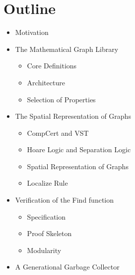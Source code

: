 \documentclass[professionalfonts, xcolor=table]{beamer}
\begin{document}
\section{Outline}
\begin{frame}
  \begin{itemize}
  \item Motivation \hspace{1ex}\alert{\Large\checkmark}
  \item The Mathematical Graph Library \hspace{1ex}\alert{\Large\checkmark}
    \begin{itemize}
    \item Core Definitions \hspace{1ex}\alert{\Large\checkmark}
    \item Architecture \hspace{1ex}\alert{\Large\checkmark}
    \item Selection of Properties \hspace{1ex}\alert{\Large\checkmark}
    \end{itemize}
  \item The Spatial Representation of Graphs \hspace{1ex}\alert{\Large\checkmark}
    \begin{itemize}
    \item CompCert and VST \hspace{1ex}\alert{\Large\checkmark}
    \item Hoare Logic and Separation Logic \hspace{1ex}\alert{\Large\checkmark}
    \item Spatial Representation of Graphs \hspace{1ex}\alert{\Large\checkmark}
    \item Localize Rule \hspace{1ex}\alert{\Large\checkmark}
    \end{itemize}
  \item Verification of the Find function
    \begin{itemize}
    \item Specification
    \item Proof Skeleton
    \item Modularity
    \end{itemize}
  \item A Generational Garbage Collector
  \end{itemize}
\end{frame}
\end{document}
